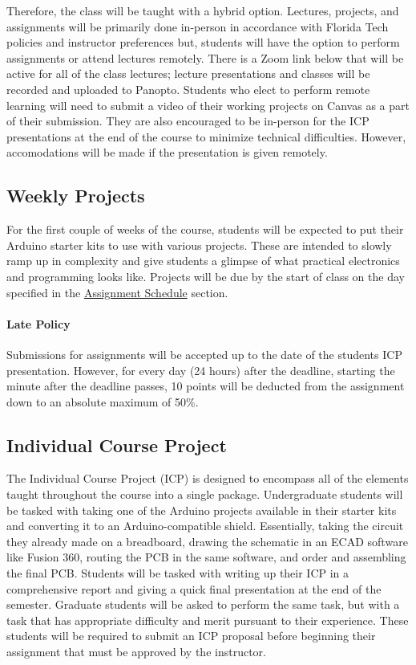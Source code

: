     Therefore, the class will be taught with a hybrid option.
    Lectures, projects, and assignments will be primarily done in-person in accordance with Florida Tech policies and instructor preferences but, students will have the option to perform assignments or attend lectures remotely.
    There is a Zoom link below that will be active for all of the class lectures; lecture presentations and classes will be recorded and uploaded to Panopto.
    Students who elect to perform remote learning will need to submit a video of their working projects on Canvas as a part of their submission.
    They are also encouraged to be in-person for the ICP presentations at the end of the course to minimize technical difficulties.
    However, accomodations will be made if the presentation is given remotely.

    \subsection*{Weekly Projects}
    For the first couple of weeks of the course, students will be expected to put their Arduino starter kits to use with various projects.
    These are intended to slowly ramp up in complexity and give students a glimpse of what practical electronics and programming looks like.
    Projects will be due by the start of class on the day specified in the \hyperref[sec:assignment_sch]{Assignment Schedule} section.
    
    \paragraph*{Late Policy} Submissions for assignments will be accepted up to the date of the students ICP presentation.
    However, for every day (24 hours) after the deadline, starting the minute after the deadline passes, 10 points will be deducted from the assignment down to an absolute maximum of 50\%.

    \subsection*{Individual Course Project}
    The Individual Course Project (ICP) is designed to encompass all of the elements taught throughout the course into a single package.
    Undergraduate students will be tasked with taking one of the Arduino projects available in their starter kits and converting it to an Arduino-compatible shield.
    Essentially, taking the circuit they already made on a breadboard, drawing the schematic in an ECAD software like Fusion 360, routing the PCB in the same software, and order and assembling the final PCB. 
    Students will be tasked with writing up their ICP in a comprehensive report and giving a quick final presentation at the end of the semester.
    Graduate students will be asked to perform the same task, but with a task that has appropriate difficulty and merit pursuant to their experience.
    These students will be required to submit an ICP proposal before beginning their assignment that must be approved by the instructor.

